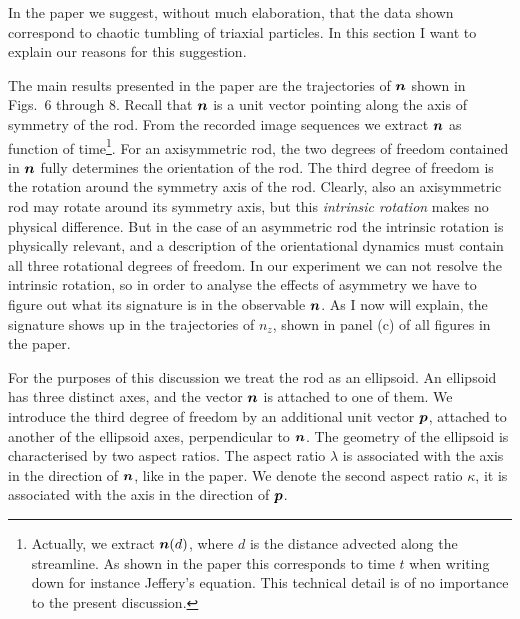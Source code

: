 \documentclass[thesis.tex]{subfiles}
\begin{document}
In the paper we suggest, without much elaboration, that the data shown correspond to chaotic tumbling of triaxial particles. In this section I want to explain our reasons for this suggestion.

The main results presented in the paper are the trajectories of $\mbox{\boldmath$n$}$ shown in Figs.~6 through 8. Recall that $\mbox{\boldmath$n$}$ is a unit vector pointing along the axis of symmetry of the rod. From the recorded image sequences we extract $\mbox{\boldmath$n$}$ as function of time\footnote{Actually, we extract $\mbox{\boldmath$n$}(d)$, where $d$ is the distance advected along the streamline. As shown in the paper this corresponds to time $t$ when writing down for instance Jeffery's equation. This technical detail is of no importance to the present discussion.}. For an axisymmetric rod, the two degrees of freedom contained in $\mbox{\boldmath$n$}$ fully determines the orientation of the rod. The third degree of freedom is the rotation around the symmetry axis of the rod. Clearly, also an axisymmetric rod may rotate around its symmetry axis, but this \emph{intrinsic rotation} makes no physical difference. But in the case of an asymmetric rod the intrinsic rotation is physically relevant, and a description of the orientational dynamics must contain all three rotational degrees of freedom. In our experiment we can not resolve the intrinsic rotation, so in order to analyse the effects of asymmetry we have to figure out what its signature is in the observable $\mbox{\boldmath$n$}$. As I now will explain, the signature shows up in the trajectories of $n_z$, shown in panel (c) of all figures in the paper. 

For the purposes of this discussion we treat the rod as an ellipsoid. An ellipsoid has three distinct axes, and the vector $\mbox{\boldmath$n$}$ is attached to one of them. We introduce the third degree of freedom by an additional unit vector $\mbox{\boldmath$p$}$, attached to another of the ellipsoid axes, perpendicular to $\mbox{\boldmath$n$}$. The geometry of the ellipsoid is characterised by two aspect ratios. The aspect ratio $\lambda$ is associated with the axis in the direction of $\mbox{\boldmath$n$}$, like in the paper. We denote the second aspect ratio $\kappa$, it is associated with the axis in the direction of $\mbox{\boldmath$p$}$. 
\end{document}
